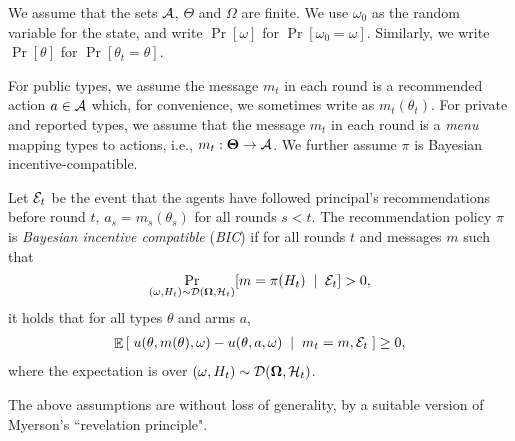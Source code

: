 We assume that the sets $\mathcal{A}$, $\varTheta$ and $\varOmega$ are finite. We use $\omega_0$ as the random variable for the state, and write $\Pr[\omega]$ for $\Pr[\omega_0=\omega]$. Similarly, we write $\Pr[\theta]$ for $\Pr[\theta_t=\theta]$.

For public types, we assume the message $m_t$ in each round is a recommended action $a \in \mathcal{A}$ which, for convenience, we sometimes write as $m_t(\theta_t)$. For private and reported types, we assume that the message $m_t$ in each round is a \emph{menu} mapping types to actions, i.e., $m_t:\bold{\Theta}\rightarrow\mathcal{A}$.  
 We further assume $\pi$ is Bayesian incentive-compatible. 
\begin{definition}
Let $\mathcal{E}_t$ be the event that the agents have followed principal's recommendations before round $t$, \ie $a_s = m_s(\theta_s)$ for all rounds $s<t$.
The recommendation policy $\pi$ is {\em Bayesian incentive compatible} (\emph{BIC}) if for all rounds $t$ and messages $m$ such that
\[ \Pr_{(\omega,H_t)\sim\mathcal{D}(\bold{\Omega},\mathcal{H}_t)}
    [m = \pi(H_t)\; \mid\; \mathcal{E}_{t}] > 0,
\]
it holds that for all types $\theta$ and arms $a$,
\begin{align}\label{eq:model-BIC-actions}
\mathop{\mathbb{E}}\left[\; u(\theta,m(\theta),\omega) - u(\theta,a,\omega) \; \mid\; m_t=m, \mathcal{E}_{t}\;\right] \geq 0,
\end{align}
where the expectation is over $(\omega,H_t)\sim\mathcal{D}(\bold{\Omega},\mathcal{H}_t)$.
\end{definition}

\noindent The above assumptions are without loss of generality, by a suitable version of Myerson's ``revelation principle".

\iffalse
For reported types and private types, we assume that the message in each round is a \emph{menu} a mapping types to actions, and assume that the recommendation policy satisfies a similar but technically different BIC condition. Again, this is without loss of generality by revelation principle. to state the BIC condition, let $\pi^t$ be the menu recommended in round $t$. The recommendation policy $\pi$ is BIC if for each round $t$, type $\theta$, and any two menus $m,m'$ such that
    $\Pr[\pi^t= m|\EE_{t-1}] > 0$, we have
\begin{align}\label{eq:model-BIC-menus}
\E\left[\; u(\theta,m(\theta),\omega) - u(\theta,m'(\theta),\omega)
    \mid \pi^t = m, \EE_{t-1}\;\right] \geq 0.
\end{align}
(Again, the expectation is over the realized state $\omega$ and the randomness in the policy.)
\fi

